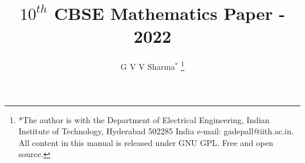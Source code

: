 \let\StandardTheFigure\thefigure
\let\vec\mathbf



\def\putbox#1#2#3{\makebox[0in][l]{\makebox[#1][l]{}\raisebox{\baselineskip}[0in][0in]{\raisebox{#2}[0in][0in]{#3}}}}
     \def\rightbox#1{\makebox[0in][r]{#1}}
     \def\centbox#1{\makebox[0in]{#1}}
     \def\topbox#1{\raisebox{-\baselineskip}[0in][0in]{#1}}
     \def\midbox#1{\raisebox{-0.5\baselineskip}[0in][0in]{#1}}

\vspace{3cm}

\title{
	\textbf{  $10^{th}$ CBSE Mathematics Paper - 2022}
}
\author{ G V V Sharma$^{*}$%
	\thanks{*The author is with the Department
		of Electrical Engineering, Indian Institute of Technology, Hyderabad
		502285 India e-mail:  gadepall@iith.ac.in. All content in this manual is released under GNU GPL.  Free and open source.}
	
}	


%
%
%

% 
%

